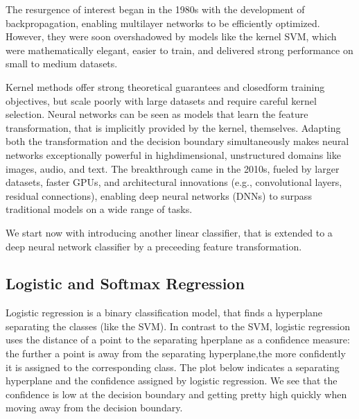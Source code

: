 \documentclass[letterpaper,10pt,english]{jupyterBook}
\begin{document}
\sphinxAtStartPar
The resurgence of interest began in the 1980s with the development of backpropagation, enabling multi\sphinxhyphen{}layer networks to be efficiently optimized. However, they were soon overshadowed by models like the kernel SVM, which were mathematically elegant, easier to train, and delivered strong performance on small to medium datasets.

\sphinxAtStartPar
Kernel methods offer strong theoretical guarantees and closed\sphinxhyphen{}form training objectives, but scale poorly with large datasets and require careful kernel selection. Neural networks can be seen as models that learn the feature transformation, that is implicitly provided by the kernel, themselves. Adapting both the transformation and the decision boundary simultaneously makes neural networks exceptionally powerful in high\sphinxhyphen{}dimensional, unstructured domains like images, audio, and text. The breakthrough came in the 2010s, fueled by larger datasets, faster GPUs, and architectural innovations (e.g., convolutional layers, residual connections), enabling deep neural networks (DNNs) to surpass traditional models on a wide range of tasks.

\sphinxAtStartPar
We start now with introducing another linear classifier, that is extended to a deep neural network classifier by a preceeding feature transformation.


\subsection{Logistic and Softmax Regression}
\label{\detokenize{neuralnets_intro:logistic-and-softmax-regression}}
\sphinxAtStartPar
Logistic regression is a binary classification model, that finds a hyperplane separating the classes (like the SVM). In contrast to the SVM, logistic regression uses the distance of a point to the separating hperplane as a confidence measure: the further a point is away from the separating hyperplane,the more confidently it is assigned to the corresponding class. The plot below indicates a separating hyperplane and the confidence assigned by logistic regression. We see that the confidence is low at the decision boundary and getting pretty high quickly when moving away from the decision boundary.
\end{document}
